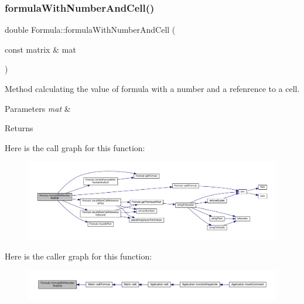 \subsubsection{\texorpdfstring{formula\+With\+Number\+And\+Cell()}{formulaWithNumberAndCell()}}
{\footnotesize\ttfamily double Formula\+::formula\+With\+Number\+And\+Cell (\begin{DoxyParamCaption}\item[{const matrix \&}]{mat }\end{DoxyParamCaption})}

Method calculating the value of formula with a number and a refenrence to a cell. 
\begin{DoxyParams}{Parameters}
{\em mat} & \\
\hline
\end{DoxyParams}
\begin{DoxyReturn}{Returns}

\end{DoxyReturn}
Here is the call graph for this function\+:\nopagebreak
\begin{figure}[H]
\begin{center}
\leavevmode
\includegraphics[width=350pt]{class_formula_a0f831b2ee98fbeb7df371f83ee7d374d_cgraph}
\end{center}
\end{figure}
Here is the caller graph for this function\+:\nopagebreak
\begin{figure}[H]
\begin{center}
\leavevmode
\includegraphics[width=350pt]{class_formula_a0f831b2ee98fbeb7df371f83ee7d374d_icgraph}
\end{center}
\end{figure}
\mbox{\label{class_formula_a518bc97bd50f1cc5573be7d3f8cb6253}} 
